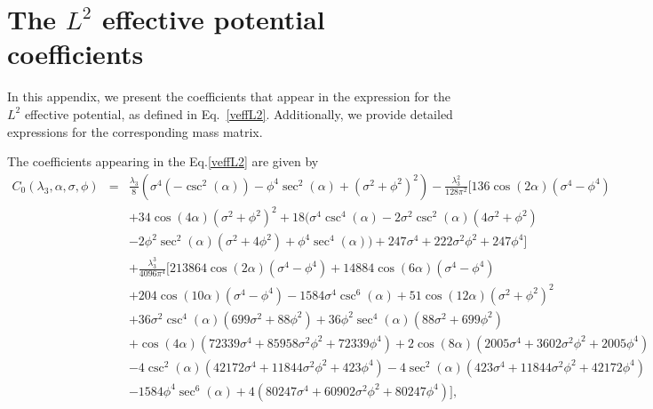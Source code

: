 \documentclass[11pt,a4paper,english,superscriptaddress,preprint,aps,prd]{revtex4}
\begin{document}
\section{The $L^2$ effective potential coefficients}\label{appendix-coefficients}

In this appendix, we present the coefficients that appear in the expression for the $L^2$ effective potential, as defined in Eq.~\eqref{veffL2}. Additionally, we provide detailed expressions for the corresponding mass matrix.

The coefficients appearing in the Eq.\eqref{veffL2} are given by
\begin{eqnarray}\label{coef0}
C_0(\lambda_3,\alpha,\sigma,\phi)&=& \frac{\lambda_3}{8} \left(\sigma ^4 \left(-\csc ^2(\alpha )\right)-\phi ^4 \sec ^2(\alpha )+\left(\sigma ^2+\phi ^2\right)^2\right) -\frac{\lambda_3^2}{128 \pi ^2} \Big[136 \cos (2 \alpha ) \left(\sigma ^4-\phi ^4\right) \nonumber\\
&& +34 \cos (4 \alpha ) \left(\sigma ^2+\phi ^2\right)^2+18 \Big(\sigma ^4 \csc ^4(\alpha )-2 \sigma ^2 \csc ^2(\alpha ) \left(4 \sigma ^2+\phi ^2\right)  \nonumber\\
&& -2 \phi ^2 \sec ^2(\alpha ) \left(\sigma ^2+4 \phi ^2\right)+\phi ^4 \sec ^4(\alpha )\Big)+247 \sigma ^4+222 \sigma ^2 \phi ^2+247 \phi ^4\Big]  \nonumber\\
&& +\frac{\lambda_3^3}{4096 \pi ^4} \Big[ 213864 \cos (2 \alpha ) \left(\sigma ^4-\phi ^4\right)+14884 \cos (6 \alpha ) \left(\sigma ^4-\phi ^4\right) \nonumber\\
&& +204 \cos (10 \alpha ) \left(\sigma ^4-\phi ^4\right)-1584 \sigma ^4 \csc ^6(\alpha )+51 \cos (12 \alpha ) \left(\sigma ^2+\phi ^2\right)^2 \nonumber\\
&& +36 \sigma ^2 \csc ^4(\alpha ) \left(699 \sigma ^2+88 \phi ^2\right)+36 \phi ^2 \sec ^4(\alpha ) \left(88 \sigma ^2+699 \phi ^2\right) \nonumber\\
&& +\cos (4 \alpha ) \left(72339 \sigma ^4+85958 \sigma ^2 \phi ^2+72339 \phi ^4\right)+2 \cos (8 \alpha ) \left(2005 \sigma ^4+3602 \sigma ^2 \phi ^2+2005 \phi ^4\right) \nonumber\\
&& -4 \csc ^2(\alpha ) \left(42172 \sigma ^4+11844 \sigma ^2 \phi ^2+423 \phi ^4\right)-4 \sec ^2(\alpha ) \left(423 \sigma ^4+11844 \sigma ^2 \phi ^2+42172 \phi ^4\right) \nonumber\\
&& -1584 \phi ^4 \sec ^6(\alpha )+4 \left(80247 \sigma ^4+60902 \sigma ^2 \phi ^2+80247 \phi ^4\right)\Big],
\end{eqnarray}
\end{document}
